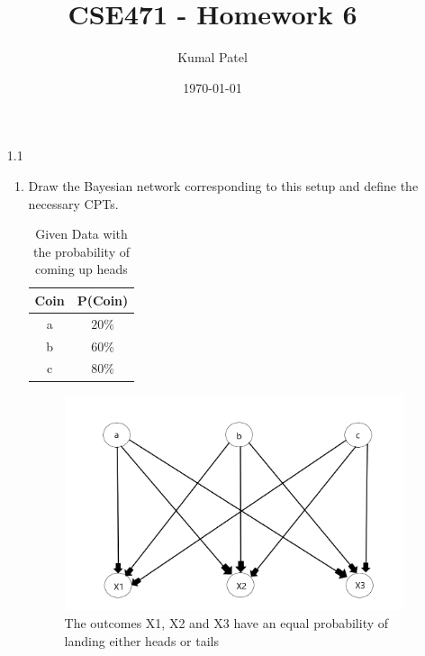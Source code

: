 \documentclass[letterpaper, 12pt]{article}
\title{CSE471 - Homework 6}
\author{Kumal Patel}
\date{\today}
\begin{document}
\maketitle

\begin{enumerate}
    \item[1.1]
        \begin{enumerate}
            \item Draw the Bayesian network corresponding to this setup and define the necessary CPTs.
                  \begin{table}[H]
                      \centering
                      \begin{tabular}{|c|c|} \hline
                          \textbf{Coin} & \textbf{P(Coin)} \\ \hline
                          a             & $20\%$           \\ \hline
                          b             & $60\%$           \\ \hline
                          c             & $80\%$           \\ \hline
                      \end{tabular}
                      \caption{Given Data with the probability of coming up heads}
                  \end{table}

                  \begin{figure}[H]
                      \centering
                      \includegraphics[width=0.5\linewidth]{q1_a.png}
                      \caption{The outcomes X1, X2 and X3 have an equal probability of landing either heads or tails}
                  \end{figure}


\end{enumerate}
\end{enumerate}
\end{document}
